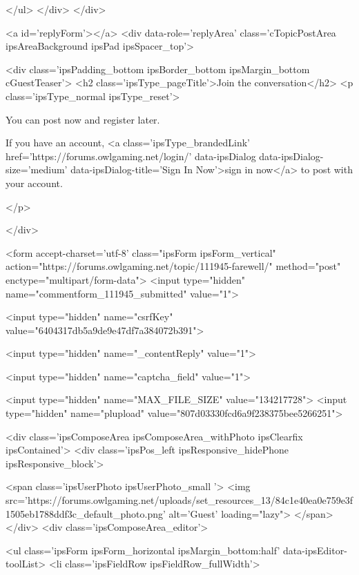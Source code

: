 		
	</ul>
</div>
		</div>
	

	
		<a id='replyForm'></a>
		<div data-role='replyArea' class='cTopicPostArea ipsAreaBackground ipsPad  ipsSpacer_top'>
			
				
				

	
		<div class='ipsPadding_bottom ipsBorder_bottom ipsMargin_bottom cGuestTeaser'>
			<h2 class='ipsType_pageTitle'>Join the conversation</h2>
			<p class='ipsType_normal ipsType_reset'>
	
				
					You can post now and register later.
				
				If you have an account, <a class='ipsType_brandedLink' href='https://forums.owlgaming.net/login/' data-ipsDialog data-ipsDialog-size='medium' data-ipsDialog-title='Sign In Now'>sign in now</a> to post with your account.
				
			</p>
	
		</div>
	


<form accept-charset='utf-8' class="ipsForm ipsForm_vertical" action="https://forums.owlgaming.net/topic/111945-farewell/" method="post" enctype="multipart/form-data">
	<input type="hidden" name="commentform_111945_submitted" value="1">
	
		<input type="hidden" name="csrfKey" value="6404317db5a9de9e47df7a384072b391">
	
		<input type="hidden" name="_contentReply" value="1">
	
		<input type="hidden" name="captcha_field" value="1">
	
	
		<input type="hidden" name="MAX_FILE_SIZE" value="134217728">
		<input type="hidden" name="plupload" value="807d03330fcd6a9f238375bee5266251">
	
	<div class='ipsComposeArea ipsComposeArea_withPhoto ipsClearfix ipsContained'>
		<div class='ipsPos_left ipsResponsive_hidePhone ipsResponsive_block'>

	<span class='ipsUserPhoto ipsUserPhoto_small '>
		<img src='https://forums.owlgaming.net/uploads/set_resources_13/84c1e40ea0e759e3f1505eb1788ddf3c_default_photo.png' alt='Guest' loading="lazy">
	</span>
</div>
		<div class='ipsComposeArea_editor'>
			
				
					
				
					
						<ul class='ipsForm ipsForm_horizontal ipsMargin_bottom:half' data-ipsEditor-toolList>
							<li class='ipsFieldRow ipsFieldRow_fullWidth'>
								



